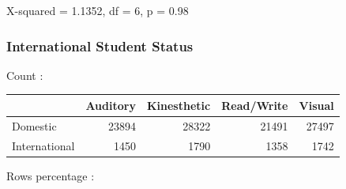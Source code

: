 \documentclass[
  twocolumn]{article}
\newenvironment{Shaded}{\begin{snugshade}}{\end{snugshade}}
\newcommand{\FunctionTok}[1]{\textcolor[rgb]{0.13,0.29,0.53}{\textbf{#1}}}
\newcommand{\NormalTok}[1]{#1}
\newcommand{\SpecialCharTok}[1]{\textcolor[rgb]{0.81,0.36,0.00}{\textbf{#1}}}
\begin{document}
X-squared = 1.1352, df = 6, p = 0.98

\subsubsection{International Student
Status}\label{international-student-status}

\begin{Shaded}
\end{Shaded}

Count :

\begin{longtable}[]{@{}lrrrr@{}}
\toprule\noalign{}
& Auditory & Kinesthetic & Read/Write & Visual \\
\midrule\noalign{}
\endhead
\bottomrule\noalign{}
\endlastfoot
Domestic & 23894 & 28322 & 21491 & 27497 \\
International & 1450 & 1790 & 1358 & 1742 \\
\end{longtable}

Rows percentage :
\end{document}
